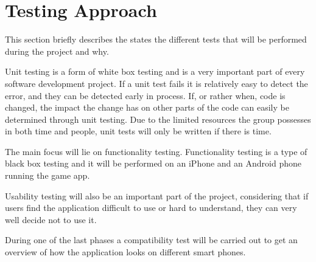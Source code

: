 \section{Testing Approach}

	This section briefly describes the states the different tests that will be performed during the project and why.

	Unit testing is a form of white box testing and is a very important part of every software development project. If a unit test fails it is relatively easy to detect the error, and they can be detected early in process. If, or rather when, code is changed, the impact the change has on other parts of the code can easily be determined through unit testing. Due to the limited resources the group possesses in both time and people, unit tests will only be written if there is time. 

	The main focus will lie on functionality testing. Functionality testing is a type of black box testing and it will be performed on an iPhone and an Android phone running the game app.

	Usability testing will also be an important part of the project, considering that if users find the application difficult to use or hard to understand, they can very well decide not to use it.

	During one of the last phases a compatibility test will be carried out to get an overview of how the application looks on different smart phones.
